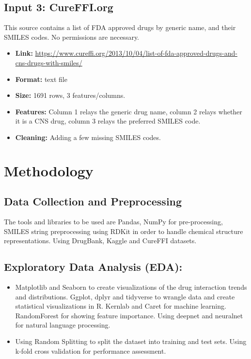 \documentclass{report}
\begin{document}
\section{Input 3: CureFFI.org}
This source contains a list of FDA approved drugs by generic name, and their SMILES codes. No permissions are necessary.
\begin{itemize}
    \item \textbf{Link:} \url{https://www.cureffi.org/2013/10/04/list-of-fda-approved-drugs-and-cns-drugs-with-smiles/}
    \item \textbf{Format:} text file
    \item \textbf{Size:} 1691 rows, 3 features/columns.
    \item \textbf{Features:} Column 1 relays the generic drug name, column 2 relays whether it is a CNS drug, column 3 relays the preferred SMILES code.
    \item \textbf{Cleaning:} Adding a few missing SMILES codes.
\end{itemize}

\chapter{Methodology}
\section{Data Collection and Preprocessing}
The tools and libraries to be used are Pandas, NumPy for pre-processing, SMILES string preprocessing using RDKit in order to handle chemical structure representations. Using DrugBank, Kaggle and CureFFI datasets. 
\section{Exploratory Data Analysis (EDA):}
\begin{itemize}
    \item Matplotlib and Seaborn to create visualizations of the drug interaction trends and distributions. Ggplot, dplyr and tidyverse to wrangle data and create statistical visualizations in R. Kernlab and Caret for machine learning. RandomForest for showing feature importance. Using deepnet and neuralnet for natural language processing.
    \item Using Random Splitting to split the dataset into training and test sets. Using k-fold cross validation for performance assessment. 
\end{itemize} 
\end{document}
